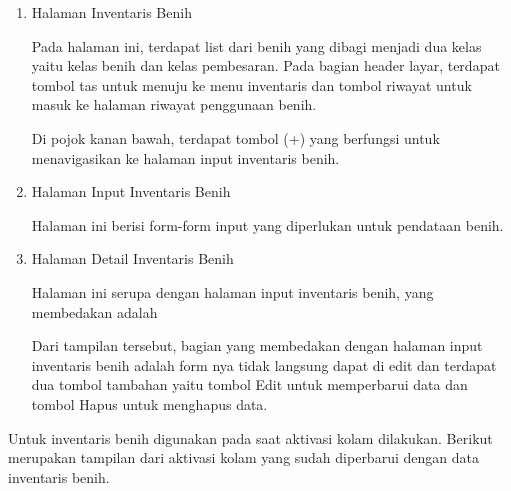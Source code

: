 \begin{spacing}{1.5}
\begin{enumerate}
		\begin{enumerate}
			\item Halaman Inventaris Benih

			Pada halaman ini, terdapat list dari benih yang dibagi menjadi dua kelas yaitu kelas benih dan kelas pembesaran. Pada bagian header layar, terdapat tombol tas untuk menuju ke menu inventaris dan tombol riwayat untuk masuk ke halaman riwayat penggunaan benih.

			Di pojok kanan bawah, terdapat tombol (+) yang berfungsi untuk menavigasikan ke halaman input inventaris benih.

			\item Halaman Input Inventaris Benih
			
			Halaman ini berisi form-form input yang diperlukan untuk pendataan benih.
			
			\item Halaman Detail Inventaris Benih
			
			Halaman ini serupa dengan halaman input inventaris benih, yang membedakan adalah 
			
			Dari tampilan tersebut, bagian yang membedakan dengan halaman input inventaris benih adalah form nya tidak langsung dapat di edit dan terdapat dua tombol tambahan yaitu tombol Edit untuk memperbarui data dan tombol Hapus untuk menghapus data.
		\end{enumerate}

		Untuk inventaris benih digunakan pada saat aktivasi kolam dilakukan. Berikut merupakan tampilan dari aktivasi kolam yang sudah diperbarui dengan data inventaris benih.


\end{enumerate}
\end{spacing}
